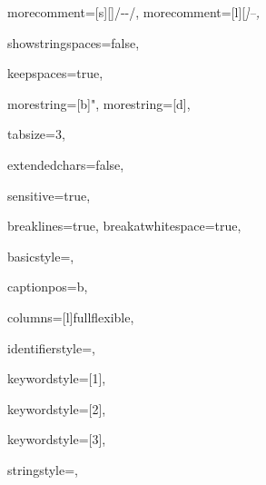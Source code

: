 {%
morecomment=[s][\color{commentcolor}]{/-}{-/},
morecomment=[l][\itshape \color{commentcolor}]{--},

showstringspaces=false,

keepspaces=true,

morestring=[b]",
morestring=[d],

tabsize=3,

extendedchars=false,

sensitive=true,

breaklines=true,
breakatwhitespace=true,

basicstyle=\ttfamily, %

captionpos=b,

columns=[l]fullflexible,


identifierstyle={\ttfamily\color{black}},

keywordstyle=[1]{\ttfamily\color{keywordcolor}},

keywordstyle=[2]{\ttfamily\color{sortcolor}},

keywordstyle=[3]{\ttfamily\color{tacticcolor}},


stringstyle=\ttfamily,


}
